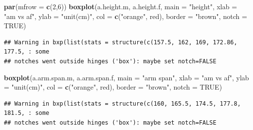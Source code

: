\documentclass[]{article}
\newenvironment{Shaded}{\begin{snugshade}}{\end{snugshade}}
\newcommand{\DataTypeTok}[1]{\textcolor[rgb]{0.13,0.29,0.53}{#1}}
\newcommand{\DecValTok}[1]{\textcolor[rgb]{0.00,0.00,0.81}{#1}}
\newcommand{\KeywordTok}[1]{\textcolor[rgb]{0.13,0.29,0.53}{\textbf{#1}}}
\newcommand{\NormalTok}[1]{#1}
\newcommand{\OtherTok}[1]{\textcolor[rgb]{0.56,0.35,0.01}{#1}}
\newcommand{\StringTok}[1]{\textcolor[rgb]{0.31,0.60,0.02}{#1}}
\begin{document}
\begin{Shaded}
\begin{Highlighting}[]
\KeywordTok{par}\NormalTok{(}\DataTypeTok{mfrow =} \KeywordTok{c}\NormalTok{(}\DecValTok{2}\NormalTok{,}\DecValTok{6}\NormalTok{))}
\KeywordTok{boxplot}\NormalTok{(a.height.m, a.height.f,}
        \DataTypeTok{main =} \StringTok{"height"}\NormalTok{,}
        \DataTypeTok{xlab =} \StringTok{"am vs af"}\NormalTok{,}
        \DataTypeTok{ylab =} \StringTok{"unit(cm)"}\NormalTok{,}
        \DataTypeTok{col =} \KeywordTok{c}\NormalTok{(}\StringTok{"orange"}\NormalTok{, }\StringTok{\textquotesingle{}red\textquotesingle{}}\NormalTok{),}
        \DataTypeTok{border =} \StringTok{"brown"}\NormalTok{,}
        \DataTypeTok{notch =} \OtherTok{TRUE}\NormalTok{)}
\end{Highlighting}
\end{Shaded}

\begin{verbatim}
## Warning in bxp(list(stats = structure(c(157.5, 162, 169, 172.86, 177.5, : some
## notches went outside hinges ('box'): maybe set notch=FALSE
\end{verbatim}

\begin{Shaded}
\begin{Highlighting}[]
\KeywordTok{boxplot}\NormalTok{(a.arm.span.m, a.arm.span.f,}
        \DataTypeTok{main =} \StringTok{"arm span"}\NormalTok{,}
        \DataTypeTok{xlab =} \StringTok{"am vs af"}\NormalTok{,}
        \DataTypeTok{ylab =} \StringTok{"unit(cm)"}\NormalTok{,}
        \DataTypeTok{col =} \KeywordTok{c}\NormalTok{(}\StringTok{"orange"}\NormalTok{, }\StringTok{\textquotesingle{}red\textquotesingle{}}\NormalTok{),}
        \DataTypeTok{border =} \StringTok{"brown"}\NormalTok{,}
        \DataTypeTok{notch =} \OtherTok{TRUE}\NormalTok{)}
\end{Highlighting}
\end{Shaded}

\begin{verbatim}
## Warning in bxp(list(stats = structure(c(160, 165.5, 174.5, 177.8, 181.5, : some
## notches went outside hinges ('box'): maybe set notch=FALSE
\end{verbatim}
\end{document}
